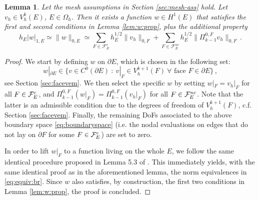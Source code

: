 \documentclass[a4paper,11pt]{article}
\newtheorem{lemma}[theorem]{Lemma}
\theoremstyle{remark}
\theoremstyle{definition}
\begin{document}
\begin{lemma}\label{lm:beiraos-lemma}
Let the mesh assumptions in Section \ref{sec:mesh-ass} hold.
Let $v_h \in V_h^k(E)$, $E \in \Omega_h$. Then it exists a function $w \in H^1(E)$ that satisfies the first and second conditions in Lemma \ref{lem:w:prop}, plus the additional property
\begin{equation}\label{eq:equiv:br}
h_E |w|_{1,E} \simeq \| w \|_{0,E} \simeq \sum_{F \in \mathcal{F}^{c}_E} h_E^{1/2} \| v_h \|_{0,F}
+ \sum_{F \in \mathcal{F}^{nc}_E} h_E^{1/2} \| \Pi^{0,F}_{k-1} v_h \|_{0,F}  \, .
\end{equation}
\end{lemma}
\begin{proof}
We start by defining $w$ on $\partial E$, which is chosen in the following set:
\begin{equation}\label{eq:boundaryspace}
w|_{\partial E} \in 
\big\{ v \in C^0(\partial E) \ : \ v|_F \in V_h^{k+1}(F) \ \forall \textrm{ face } F \in \partial E \big\} \, ,
\end{equation}
see Section \ref{sec:facevem}. We then select the specific $w$ by setting $w|_F = v_h |_F$ for all $F \in {\cal F}^c_E$, and $\Pi^{0,F}_{k-1} (w|_F) = \Pi^{0,F}_{k-1} (v_h |_F)$ for all $F \in {\cal F}^{nc}_E$. Note that the latter is an admissible condition due to the degrees of freedom of $V_h^{k+1}(F)$, c.f. Section \ref{sec:facevem}. Finally, the remaining DoFs associated to the above boundary space \eqref{eq:boundaryspace} (i.e. the nodal evaluations on edges that do not lay on $\partial F$ for some $F \in {\cal F}^c_E$) are set to zero. 

In order to lift $w|_F$ to a function living on the whole $E$, we follow the same identical procedure proposed in Lemma 5.3 of \cite{Brenner2017}. This immediately yields, with the same identical proof as in the aforementioned lemma, the norm equivalences in \eqref{eq:equiv:br}.
Since $w$ also satisfies, by construction, the first two conditions in Lemma \ref{lem:w:prop}, the proof is concluded.
\end{proof}
\end{document}
